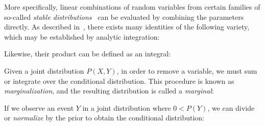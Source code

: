 \documentclass[11pt]{article}
\begin{document}
    \noindent More specifically, linear combinations of random variables from certain families of so-called \textit{stable distributions}~\cite{levy1925calcul} can be evaluated by combining the parameters directly. As described in~\cite{willard2020minikanren}, there exists many identities of the following variety, which may be established by analytic integration:

    \begin{prooftree}
    \end{prooftree}

Likewise, their product can be defined as an integral:


\begin{prooftree}
\end{prooftree}

    \noindent Given a joint distribution $P(X, Y)$, in order to remove a variable, we must sum or integrate over the conditional distribution. This procedure is known as \textit{marginalization}, and the resulting distribution is called a \textit{marginal}:

    \begin{prooftree}
    \end{prooftree}

    \noindent If we observe an event $Y$ in a joint distribution where $0 < P(Y)$, we can divide or \textit{normalize} by the prior to obtain the conditional distribution:

    \begin{prooftree}
    \end{prooftree}
\end{document}
